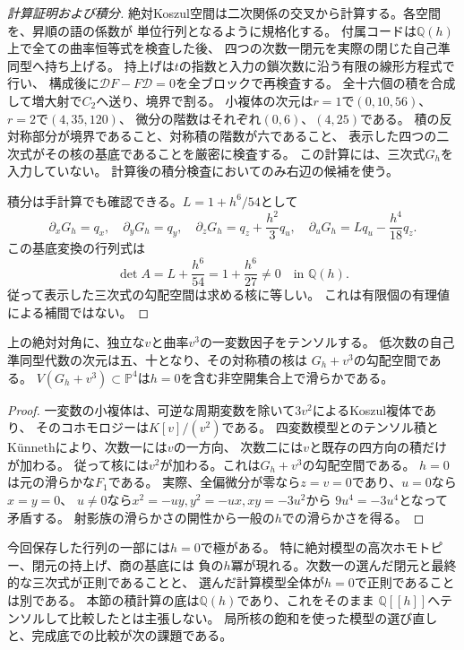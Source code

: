 \begin{proof}[計算証明および積分]
絶対Koszul空間は二次関係の交叉から計算する。各空間を、昇順の語の係数が
単位行列となるように規格化する。
付属コードは$\mathbb Q(h)$上で全ての曲率恒等式を検査した後、
四つの次数一閉元を実際の閉じた自己準同型へ持ち上げる。
持上げは$t$の指数と入力の鎖次数に沿う有限の線形方程式で行い、
構成後に$\mathcal DF-F\mathcal D=0$を全ブロックで再検査する。
全十六個の積を合成して増大射で$C_2$へ送り、境界で割る。
小複体の次元は$r=1$で$(0,10,56)$、$r=2$で$(4,35,120)$、
微分の階数はそれぞれ$(0,6)$、$(4,25)$である。
積の反対称部分が境界であること、対称積の階数が六であること、
表示した四つの二次式がその核の基底であることを厳密に検査する。
この計算には、三次式$G_h$を入力していない。
計算後の積分検査においてのみ右辺の候補を使う。

積分は手計算でも確認できる。$L=1+h^6/54$として
\[
 \partial_xG_h=q_x,\quad \partial_yG_h=q_y,\quad
 \partial_zG_h=q_z+\frac{h^2}{3}q_u,\quad
 \partial_uG_h=Lq_u-\frac{h^4}{18}q_z.
\]
この基底変換の行列式は
\[
 \det A=L+\frac{h^6}{54}=1+\frac{h^6}{27}\ne0
 \quad\text{in }\mathbb Q(h).
\]
従って表示した三次式の勾配空間は求める核に等しい。
これは有限個の有理値による補間ではない。
\end{proof}

\begin{corollary}[五変数の代数的候補]
上の絶対対角に、独立な$v$と曲率$v^3$の一変数因子をテンソルする。
低次数の自己準同型代数の次元は五、十となり、その対称積の核は
$G_h+v^3$の勾配空間である。
$V(G_h+v^3)\subset\mathbb P^4$は$h=0$を含む非空開集合上で滑らかである。
\end{corollary}
\begin{proof}
一変数の小複体は、可逆な周期変数を除いて$3v^2$によるKoszul複体であり、
そのコホモロジーは$K[v]/(v^2)$である。
四変数模型とのテンソル積とK\"unnethにより、次数一には$v$の一方向、
次数二には$v$と既存の四方向の積だけが加わる。
従って核には$v^2$が加わる。これは$G_h+v^3$の勾配空間である。
$h=0$は元の滑らかな$F_1$である。
実際、全偏微分が零なら$z=v=0$であり、$u=0$なら$x=y=0$、
$u\ne0$なら$x^2=-uy,y^2=-ux,xy=-3u^2$から
$9u^4=-3u^4$となって矛盾する。
射影族の滑らかさの開性から一般の$h$での滑らかさを得る。
\end{proof}

\begin{remark}[generic計算と局所正則化]
今回保存した行列の一部には$h=0$で極がある。
特に絶対模型の高次ホモトピー、閉元の持上げ、商の基底には
負の$h$冪が現れる。次数一の選んだ閉元と最終的な三次式が正則であることと、
選んだ計算模型全体が$h=0$で正則であることは別である。
本節の積計算の底は$\mathbb Q(h)$であり、これをそのまま
$\mathbb Q[[h]]$へテンソルして比較したとは主張しない。
局所核の飽和を使った模型の選び直しと、完成底での比較が次の課題である。
\end{remark}

